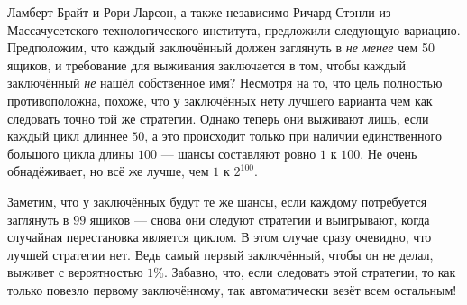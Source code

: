 Ламберт Брайт и Рори Ларсон, а также независимо Ричард Стэнли из Массачусетского технологического института, предложили следующую вариацию.
Предположим, что каждый заключённый должен заглянуть в \emph{не менее} чем 50 ящиков, и требование для выживания заключается в том, чтобы каждый заключённый \emph{не} нашёл собственное имя?
Несмотря на то, что цель полностью противоположна, похоже, что у заключённых нету лучшего варианта чем как следовать точно той же стратегии.
Однако теперь они выживают лишь, если каждый цикл длиннее $50$, а это происходит только при наличии единственного большого цикла длины $100$ --- шансы составляют ровно $1$ к $100$.
Не очень обнадёживает, но всё же лучше, чем $1$ к $2^{100}$.

Заметим, что у заключённых будут те же шансы, если каждому потребуется заглянуть в $99$ ящиков --- снова они следуют стратегии и выигрывают, когда случайная перестановка является циклом.
В этом случае сразу очевидно, что лучшей стратегии нет.
Ведь самый первый заключённый, чтобы он не делал, выживет с вероятностью $1\%$.
Забавно, что, если следовать этой стратегии, то как только повезло первому заключённому, так автоматически везёт всем остальным!
